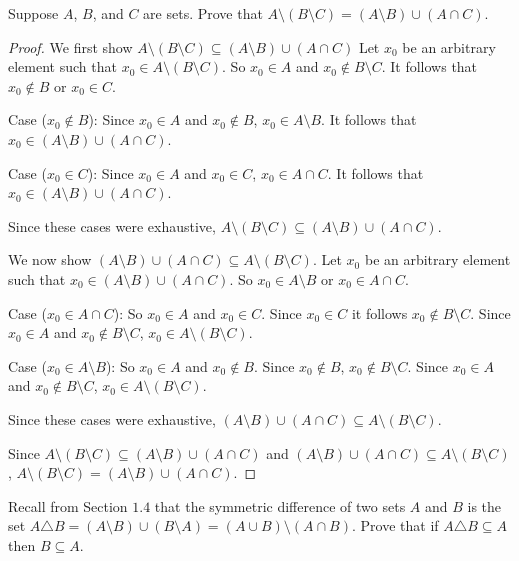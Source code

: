 \begin{tcolorbox}[title=Problem 4, breakable]
    Suppose $A$, $B$, and $C$ are sets.
    Prove that $A \setminus (B \setminus C) = (A \setminus B) \cup (A \cap C)$.
\end{tcolorbox}

\begin{proof}
    We first show $A \setminus (B \setminus C) \subseteq (A \setminus B) \cup (A \cap C)$
    Let $x_0$ be an arbitrary element such that $x_0 \in A \setminus (B \setminus C)$.
    So $x_0 \in A$ and $x_0 \not \in B \setminus C$.
    It follows that $x_0 \not \in B$ or $x_0 \in C$.

    Case ($x_0 \not \in B$): Since $x_0 \in A$ and $x_0 \not \in B$, $x_0 \in A
        \setminus B$. It follows that $x_0 \in (A \setminus B) \cup (A \cap C)$.

    Case ($x_0 \in C$): Since $x_0 \in A$ and $x_0 \in C$, $x_0 \in A \cap C$. It
    follows that $x_0 \in (A \setminus B) \cup (A \cap C)$.

    Since these cases were exhaustive, $A \setminus (B \setminus C) \subseteq (A
        \setminus B) \cup (A \cap C)$.

    We now show $(A \setminus B) \cup (A \cap C) \subseteq A \setminus (B \setminus
        C)$. Let $x_0$ be an arbitrary element such that $x_0 \in (A \setminus B) \cup
        (A \cap C)$. So $x_0 \in A \setminus B$ or $x_0 \in A \cap C$.

    Case ($x_0 \in A \cap C$): So $x_0 \in A$ and $x_0 \in C$. Since $x_0 \in C$ it
    follows $x_0 \not \in B \setminus C$. Since $x_0 \in A$ and $x_0 \not \in B
        \setminus C$, $x_0 \in A \setminus (B \setminus C)$.

    Case ($x_0 \in A \setminus B$): So $x_0 \in A$ and $x_0 \not \in B$. Since $x_0
        \not \in B$, $x_0 \not \in B \setminus C$. Since $x_0 \in A$ and $x_0 \not \in
        B \setminus C$, $x_0 \in A \setminus (B \setminus C)$.

    Since these cases were exhaustive, $(A \setminus B) \cup (A \cap C) \subseteq A
        \setminus (B \setminus C)$.

    Since $A \setminus (B \setminus C) \subseteq (A \setminus B) \cup (A \cap C)$
    and $(A \setminus B) \cup (A \cap C) \subseteq A \setminus (B \setminus C)$, $A
        \setminus (B \setminus C) = (A \setminus B) \cup (A \cap C)$.
\end{proof}

\begin{tcolorbox}[title=Problem 6, breakable]
    Recall from Section $1.4$ that the symmetric difference
    of two sets $A$ and $B$ is the set 
    $A \triangle B = (A \setminus B) \cup (B \setminus A)
        = (A \cup B) \setminus (A \cap B)$. Prove 
    that if $A \triangle B \subseteq A$ then $B \subseteq A$.
\end{tcolorbox}


